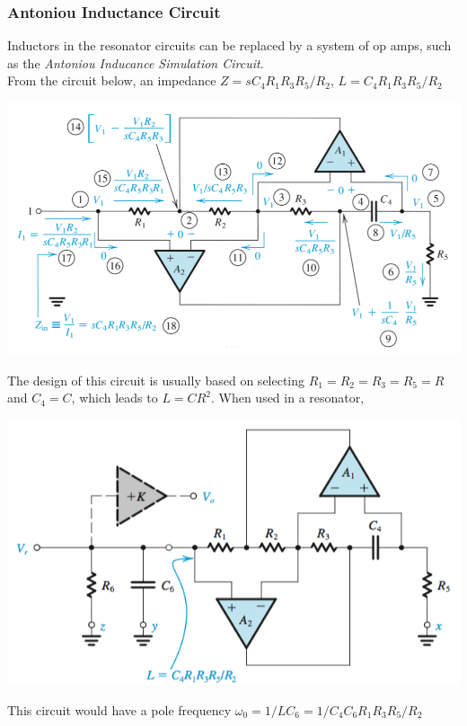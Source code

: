 \documentclass[11pt]{article}
\begin{document}
    \subsubsection{Antoniou Inductance Circuit}

    Inductors in the resonator circuits can be replaced by a system of op amps, such as the \textit{Antoniou Inducance Simulation Circuit}. \\
    
    From the circuit below, an impedance $Z = sC_4R_1R_3R_5/R_2$, $L = C_4R_1R_3R_5/R_2$

    \includegraphics[width=\textwidth]{antoniou}

    The design of this circuit is usually based on selecting $R_1 = R_2 = R_3 = R_5 = R$ and $C_4 = C$, which leads to $L = CR^2$. When used in a resonator,

    \includegraphics[width=\textwidth]{antoniou-res}

    This circuit would have a pole frequency $\omega_0 = 1/LC_6 = 1/C_4C_6R_1R_3R_5/R_2$ \\
    
\end{document}
